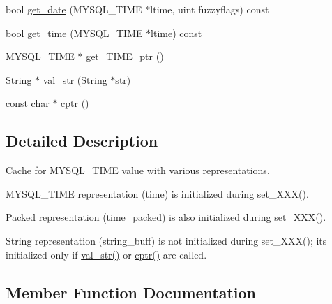 \begin{DoxyCompactItemize}
\item 
bool \mbox{\hyperlink{classMYSQL__TIME__cache_a04b7f729adc80c39d4a4fa4008ad6af2}{get\+\_\+date}} (M\+Y\+S\+Q\+L\+\_\+\+T\+I\+ME $\ast$ltime, uint fuzzyflags) const
\item 
bool \mbox{\hyperlink{classMYSQL__TIME__cache_a1b68df1e56c5afae6876df13c1f673d8}{get\+\_\+time}} (M\+Y\+S\+Q\+L\+\_\+\+T\+I\+ME $\ast$ltime) const
\item 
M\+Y\+S\+Q\+L\+\_\+\+T\+I\+ME $\ast$ \mbox{\hyperlink{classMYSQL__TIME__cache_a85477e5e44e11713a5943b02ea51bc3d}{get\+\_\+\+T\+I\+M\+E\+\_\+ptr}} ()
\item 
String $\ast$ \mbox{\hyperlink{classMYSQL__TIME__cache_ae7dc05379acd79167e89bb408386b178}{val\+\_\+str}} (String $\ast$str)
\item 
const char $\ast$ \mbox{\hyperlink{classMYSQL__TIME__cache_a5fc8b3afaa699e30bd799095ba7e09eb}{cptr}} ()
\end{DoxyCompactItemize}


\subsection{Detailed Description}
Cache for M\+Y\+S\+Q\+L\+\_\+\+T\+I\+ME value with various representations.


\begin{DoxyItemize}
\item M\+Y\+S\+Q\+L\+\_\+\+T\+I\+ME representation (time) is initialized during set\+\_\+\+X\+X\+X().
\item Packed representation (time\+\_\+packed) is also initialized during set\+\_\+\+X\+X\+X().
\item String representation (string\+\_\+buff) is not initialized during set\+\_\+\+X\+X\+X(); it\textquotesingle{}s initialized only if \mbox{\hyperlink{classMYSQL__TIME__cache_ae7dc05379acd79167e89bb408386b178}{val\+\_\+str()}} or \mbox{\hyperlink{classMYSQL__TIME__cache_a5fc8b3afaa699e30bd799095ba7e09eb}{cptr()}} are called. 
\end{DoxyItemize}

\subsection{Member Function Documentation}
\mbox{\label{classMYSQL__TIME__cache_a5fc8b3afaa699e30bd799095ba7e09eb}} 
